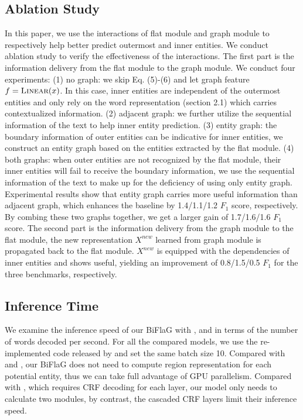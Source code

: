 \documentclass[11pt,a4paper]{article}
\begin{document}
\subsection{Ablation Study}
In this paper, we use the interactions of flat module and graph module to respectively help better predict outermost and inner entities. We conduct ablation study to verify the effectiveness of the interactions.
The first part is the information delivery from the flat  module to the graph module.
We conduct four experiments: (1) no graph: we skip Eq. (5)-(6) and let graph feature $f = \Call{Linear}{x}$. In this case, inner entities are independent of the outermost entities and only rely on the word representation (section 2.1) which carries contextualized information. (2) adjacent graph: we further utilize the sequential information of the text to help inner entity prediction. (3) entity graph: the boundary information of outer entities can be indicative for inner entities, we construct an entity graph based on the entities extracted by the flat module. (4) both graphs: when outer entities are not recognized by the flat module, their inner entities will fail to receive the boundary information, we use the sequential information of the text to make up for the deficiency of using only entity graph. Experimental results show that entity graph carries more useful information than adjacent graph, which enhances the baseline by 1.4/1.1/1.2 $F_1$ score, respectively.
By combing these two graphs together, we get a larger gain of 1.7/1.6/1.6 $F_1$ score.
The second part is the information delivery from  the graph module  to  the flat module, the new representation $X^{new}$ learned from graph module is propagated back to the flat  module. $X^{new}$ is equipped with the dependencies of inner entities and shows useful, yielding an improvement of 0.8/1.5/0.5 $F_1$ for the three benchmarks, respectively.


\subsection{Inference Time}

We examine the inference speed of our BiFlaG with \cite{zheng2019boundary}, \cite{sohrab2018deep} and \cite{ju2018neural}  in terms of the number of words decoded per second. 
For all the compared models, we use the re-implemented code released by \cite{zheng2019boundary} and set the same batch size 10.
Compared with \cite{zheng2019boundary} and \cite{sohrab2018deep}, our BiFlaG
does not need to compute region representation for each potential entity, thus we can take full advantage of GPU parallelism.
Compared with \cite{ju2018neural}, which requires CRF decoding for each layer, our model only needs to calculate two modules, by contrast, the cascaded CRF layers limit their inference speed.
\end{document}
